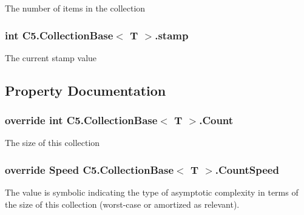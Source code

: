 The number of items in the collection 

\hypertarget{class_c5_1_1_collection_base_ae13bd5b482306a49a4d10654a9b8b064}{}
\subsubsection[{stamp}]{\setlength{\rightskip}{0pt plus 5cm}int {\bf C5.\+Collection\+Base}$<$ T $>$.stamp\hspace{0.3cm}{\ttfamily [protected]}}\label{class_c5_1_1_collection_base_ae13bd5b482306a49a4d10654a9b8b064}


The current stamp value 



\subsection{Property Documentation}
\hypertarget{class_c5_1_1_collection_base_abd3c5c23faf3d44196d125676ae03039}{}
\subsubsection[{Count}]{\setlength{\rightskip}{0pt plus 5cm}override int {\bf C5.\+Collection\+Base}$<$ T $>$.Count\hspace{0.3cm}{\ttfamily [get]}}\label{class_c5_1_1_collection_base_abd3c5c23faf3d44196d125676ae03039}




The size of this collection\hypertarget{class_c5_1_1_collection_base_a2c5361c8da79a23905c1730bb3cfce5b}{}
\subsubsection[{Count\+Speed}]{\setlength{\rightskip}{0pt plus 5cm}override {\bf Speed} {\bf C5.\+Collection\+Base}$<$ T $>$.Count\+Speed\hspace{0.3cm}{\ttfamily [get]}}\label{class_c5_1_1_collection_base_a2c5361c8da79a23905c1730bb3cfce5b}


The value is symbolic indicating the type of asymptotic complexity in terms of the size of this collection (worst-\/case or amortized as relevant). 

